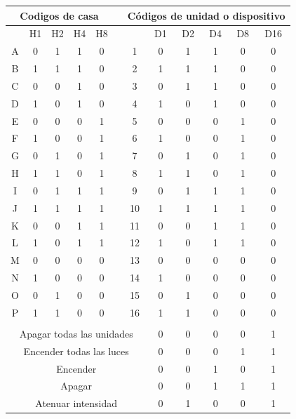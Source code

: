 \begin{table}[htbp]
\centering
\begin{tabular}{cccccccccccc}
\toprule
\multicolumn{5}{c}{Codigos de casa} &  &\multicolumn{6}{c}{Códigos de unidad o dispositivo}\\ \toprule
  & H1 & H2 & H4 & H8 &    &    & D1 & D2 & D4 & D8 & D16\\ \midrule
A & 0  & 1  & 1  & 0  &    & 1  & 0  & 1  & 1  & 0  & 0\\
B & 1  & 1  & 1  & 0  &    & 2  & 1  & 1  & 1  & 0  & 0\\
C & 0  & 0  & 1  & 0  &    & 3  & 0  & 1  & 1  & 0  & 0\\
D & 1  & 0  & 1  & 0  &    & 4  & 1  & 0  & 1  & 0  & 0\\
E & 0  & 0  & 0  & 1  &    & 5  & 0  & 0  & 0  & 1  & 0\\
F & 1  & 0  & 0  & 1  &    & 6  & 1  & 0  & 0  & 1  & 0\\
G & 0  & 1  & 0  & 1  &    & 7  & 0  & 1  & 0  & 1  & 0\\
H & 1  & 1  & 0  & 1  &    & 8  & 1  & 1  & 0  & 1  & 0\\
I & 0  & 1  & 1  & 1  &    & 9  & 0  & 1  & 1  & 1  & 0\\
J & 1  & 1  & 1  & 1  &    & 10 & 1  & 1  & 1  & 1  & 0\\
K & 0  & 0  & 1  & 1  &    & 11 & 0  & 0  & 1  & 1  & 0\\
L & 1  & 0  & 1  & 1  &    & 12 & 1  & 0  & 1  & 1  & 0\\
M & 0  & 0  & 0  & 0  &    & 13 & 0  & 0  & 0  & 0  & 0\\
N & 1  & 0  & 0  & 0  &    & 14 & 1  & 0  & 0  & 0  & 0\\
O & 0  & 1  & 0  & 0  &    & 15 & 0  & 1  & 0  & 0  & 0\\
P & 1  & 1  & 0  & 0  &    & 16 & 1  & 1  & 0  & 0  & 0\\ \bottomrule \addlinespace
\multicolumn{12}{c}{Funciones}\\ \midrule
\multicolumn{7}{c}{Apagar todas las unidades} & 0 & 0 & 0 & 0 & 1 \\
\multicolumn{7}{c}{Encender todas las luces}  & 0 & 0 & 0 & 1 & 1 \\
\multicolumn{7}{c}{Encender}                  & 0 & 0 & 1 & 0 & 1 \\
\multicolumn{7}{c}{Apagar}                    & 0 & 0 & 1 & 1 & 1 \\
\multicolumn{7}{c}{Atenuar intensidad}        & 0 & 1 & 0 & 0 & 1 \\

\end{tabular}
\end{table}
